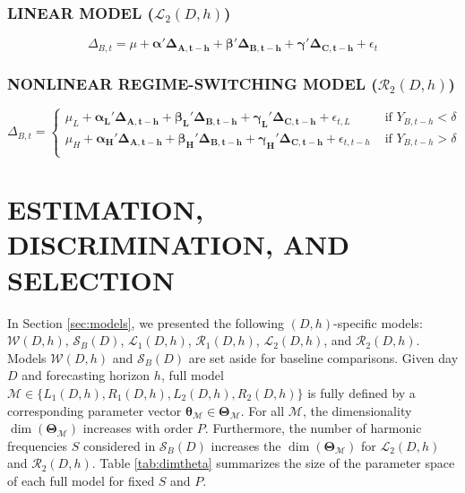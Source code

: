 \subsubsection{LINEAR MODEL ($\mathcal{L}_2(D,h)$)}
\begin{equation}
\label{eq:ardl2}
\Delta_{B,t}=\mu+\bm{\alpha}'\bm{\Delta_{A,t-h}}+\bm{\beta}'\bm{\Delta_{B,t-h}}+\bm{\gamma}'\bm{\Delta_{C,t-h}}+\epsilon_t
\end{equation}

\subsubsection{NONLINEAR REGIME-SWITCHING MODEL ($\mathcal{R}_2(D,h)$)}
\begin{equation}
\label{eq:setardl2}
\Delta_{B,t}=
  \begin{cases}
    \mu_L+\bm{\alpha_L}'\bm{\Delta_{A,t-h}}+\bm{\beta_L}'\bm{\Delta_{B,t-h}}+\bm{\gamma_L}'\bm{\Delta_{C,t-h}}+\epsilon_{t,L} & \textrm{ if } Y_{B,t-h}<\delta \\
    \mu_H+\bm{\alpha_H}'\bm{\Delta_{A,t-h}}+\bm{\beta_H}'\bm{\Delta_{B,t-h}}+\bm{\gamma_H}'\bm{\Delta_{C,t-h}}+\epsilon_{t,t-h} & \textrm{ if } Y_{B,t-h}>\delta \\
  \end{cases}
\end{equation}








\section{ESTIMATION, DISCRIMINATION, AND SELECTION}
\label{sec:bayesest}
In Section \ref{sec:models}, we presented the following $(D,h)$-specific models: $\mathcal{W}(D,h)$, $\mathcal{S}_B(D)$, $\mathcal{L}_1(D,h)$, $\mathcal{R}_1(D,h)$, $\mathcal{L}_2(D,h)$, and $\mathcal{R}_2(D,h)$. Models $\mathcal{W}(D,h)$ and $\mathcal{S}_B(D)$ are set aside for baseline comparisons. Given day $D$ and forecasting horizon $h$, full model $\mathcal{M} \in \{L_1(D,h),R_1(D,h),L_2(D,h),R_2(D,h)\}$ is fully defined by a corresponding parameter vector $\bm{\theta}_{\mathcal{M}}\in \bm{\Theta}_\mathcal{M}$. For all $\mathcal{M}$, the dimensionality $\dim(\bm{\Theta}_\mathcal{M})$ increases with order $P$. Furthermore, the number of harmonic frequencies $S$ considered in $\mathcal{S}_B(D)$ increases the $\dim(\bm{\Theta}_\mathcal{M})$ for $\mathcal{L}_2(D,h)$ and $\mathcal{R}_2(D,h)$. Table \ref{tab:dimtheta} summarizes the size of the parameter space of each full model for fixed $S$ and $P$.

